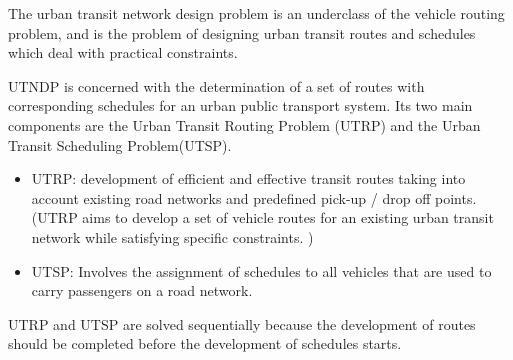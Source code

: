 The urban transit network design problem is an underclass of the vehicle routing problem, and is the problem of designing urban transit routes and schedules which deal with practical constraints.

UTNDP is concerned with the determination of a set of routes with corresponding schedules for an urban public transport system. Its two main components are the Urban Transit Routing Problem (UTRP) and the Urban Transit Scheduling Problem(UTSP). 
\begin{itemize}
\item UTRP: development of efficient and effective transit routes taking into account existing road networks and predefined pick-up / drop off points. (UTRP aims to develop a set of vehicle routes for an existing urban transit network while satisfying specific constraints. )
\item UTSP: Involves the assignment of schedules to all vehicles that are used to carry passengers on a road network. 
\end{itemize}
UTRP and UTSP are solved sequentially because the development of routes should be completed before the development of schedules starts.
\citep{kechagiopoulos14}



